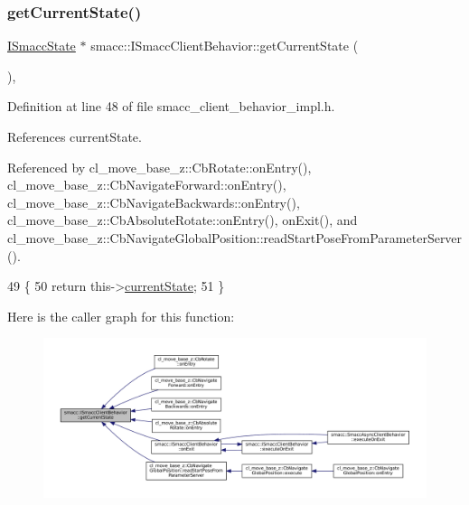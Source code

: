 \subsubsection{\texorpdfstring{get\+Current\+State()}{getCurrentState()}}
{\footnotesize\ttfamily \hyperlink{classsmacc_1_1ISmaccState}{I\+Smacc\+State} $\ast$ smacc\+::\+I\+Smacc\+Client\+Behavior\+::get\+Current\+State (\begin{DoxyParamCaption}{ }\end{DoxyParamCaption})\hspace{0.3cm}{\ttfamily [inline]}, {\ttfamily [protected]}}



Definition at line 48 of file smacc\+\_\+client\+\_\+behavior\+\_\+impl.\+h.



References current\+State.



Referenced by cl\+\_\+move\+\_\+base\+\_\+z\+::\+Cb\+Rotate\+::on\+Entry(), cl\+\_\+move\+\_\+base\+\_\+z\+::\+Cb\+Navigate\+Forward\+::on\+Entry(), cl\+\_\+move\+\_\+base\+\_\+z\+::\+Cb\+Navigate\+Backwards\+::on\+Entry(), cl\+\_\+move\+\_\+base\+\_\+z\+::\+Cb\+Absolute\+Rotate\+::on\+Entry(), on\+Exit(), and cl\+\_\+move\+\_\+base\+\_\+z\+::\+Cb\+Navigate\+Global\+Position\+::read\+Start\+Pose\+From\+Parameter\+Server().


\begin{DoxyCode}
49 \{
50     \textcolor{keywordflow}{return} this->\hyperlink{classsmacc_1_1ISmaccClientBehavior_a5a6658a2deb72b700ae595e594617616}{currentState};
51 \}
\end{DoxyCode}
Here is the caller graph for this function\+:
\nopagebreak
\begin{figure}[H]
\begin{center}
\leavevmode
\includegraphics[width=350pt]{classsmacc_1_1ISmaccClientBehavior_a34fde34e48fa13db622ee60d8374d0b8_icgraph}
\end{center}
\end{figure}
\mbox{\label{classsmacc_1_1ISmaccClientBehavior_a18e4bec9460b010f2894c0f7e7064a34}} 
